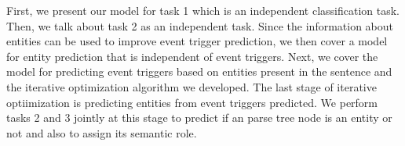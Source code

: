 First, we present our model for task 1 which is an independent classification task. Then, we talk about task 2 as an independent task. Since the information about entities can be used to improve event trigger prediction, we then cover a model for entity prediction that is independent of event triggers. Next, we cover the model for predicting event triggers based on entities present in the sentence and the iterative optimization algorithm we developed. The last stage of iterative optiimization is predicting entities from event triggers predicted. We perform tasks 2 and 3 jointly at this stage to predict if an parse tree node is an entity or not and also to assign its semantic role.